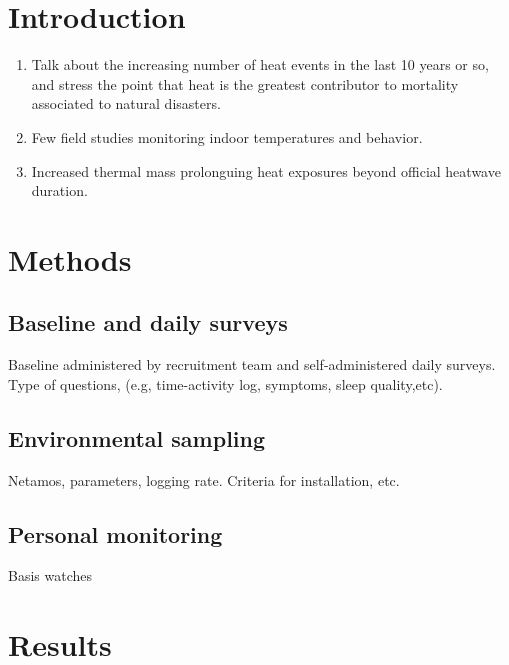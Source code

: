 \documentclass[11pt,]{article}
\providecommand{\tightlist}{%
\setlength{\itemsep}{0pt}\setlength{\parskip}{0pt}}
\begin{document}
\vskip 6.5pt

\noindent  \section{Introduction}\label{introduction}

\begin{enumerate}
\def\labelenumi{\arabic{enumi})}
\tightlist
\item
  Talk about the increasing number of heat events in the last 10 years
  or so, and stress the point that heat is the greatest contributor to
  mortality associated to natural disasters.
\item
  Few field studies monitoring indoor temperatures and behavior.
\item
  Increased thermal mass prolonguing heat exposures beyond official
  heatwave duration.
\end{enumerate}

\section{Methods}\label{methods}

\subsection{Baseline and daily
surveys}\label{baseline-and-daily-surveys}

Baseline administered by recruitment team and self-administered daily
surveys. Type of questions, (e.g, time-activity log, symptoms, sleep
quality,etc).

\subsection{Environmental sampling}\label{environmental-sampling}

Netamos, parameters, logging rate. Criteria for installation, etc.

\subsection{Personal monitoring}\label{personal-monitoring}

Basis watches

\section{Results}\label{results}
\end{document}
